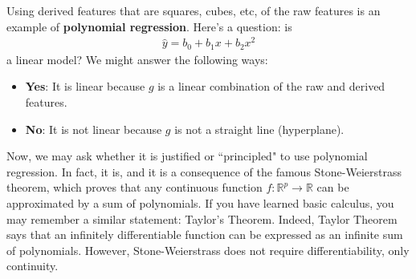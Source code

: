 \documentclass[12pt, a4paper]{article}
\theoremstyle{definition}
\begin{document}
	Using derived features that are squares, cubes, etc, of the raw features is an example
	of \textbf{polynomial regression}. Here's a question: is
	\begin{align*}
		\hat{y} = b_0 + b_1x + b_2 x^2
	\end{align*}
	a linear model? We might answer the following ways:
	\begin{itemize}
		\item \textbf{Yes}: It is linear because $g$ is a linear combination of the
		raw and derived features.
	\item \textbf{No}: It is not linear because $g$ is not a straight line (hyperplane).	\end{itemize}
	Now, we may ask whether it is justified or ``principled" to use polynomial regression.
	In fact, it is, and it is a consequence of the famous Stone-Weierstrass theorem, which
	proves that any continuous function $f:\mathbb{R}^p\to \mathbb{R}$ can be approximated
	by a sum of polynomials. If you have learned basic calculus, you may remember a similar
	statement: Taylor's Theorem. Indeed, Taylor Theorem says that an infinitely differentiable
	function can be expressed as an infinite sum of polynomials. However, Stone-Weierstrass
	does not require differentiability, only continuity.
	
\end{document}

